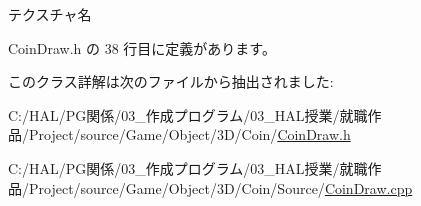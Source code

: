 テクスチャ名 



 Coin\+Draw.\+h の 38 行目に定義があります。



このクラス詳解は次のファイルから抽出されました\+:\begin{DoxyCompactItemize}
\item 
C\+:/\+H\+A\+L/\+P\+G関係/03\+\_\+作成プログラム/03\+\_\+\+H\+A\+L授業/就職作品/\+Project/source/\+Game/\+Object/3\+D/\+Coin/\mbox{\hyperlink{_coin_draw_8h}{Coin\+Draw.\+h}}\item 
C\+:/\+H\+A\+L/\+P\+G関係/03\+\_\+作成プログラム/03\+\_\+\+H\+A\+L授業/就職作品/\+Project/source/\+Game/\+Object/3\+D/\+Coin/\+Source/\mbox{\hyperlink{_coin_draw_8cpp}{Coin\+Draw.\+cpp}}\end{DoxyCompactItemize}
